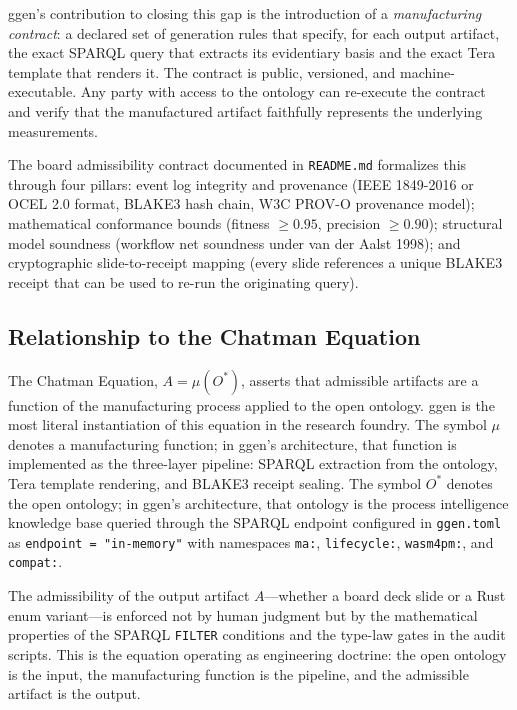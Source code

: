 ggen's contribution to closing this gap is the introduction of a \emph{manufacturing contract}:
a declared set of generation rules that specify, for each output artifact, the exact SPARQL query
that extracts its evidentiary basis and the exact Tera template that renders it. The contract is
public, versioned, and machine-executable. Any party with access to the ontology can re-execute
the contract and verify that the manufactured artifact faithfully represents the underlying
measurements.

The board admissibility contract documented in \texttt{README.md} formalizes this through four
pillars: event log integrity and provenance (IEEE 1849-2016 or OCEL 2.0 format, BLAKE3 hash
chain, W3C PROV-O provenance model); mathematical conformance bounds (fitness $\geq 0.95$,
precision $\geq 0.90$); structural model soundness (workflow net soundness under van der Aalst
1998); and cryptographic slide-to-receipt mapping (every slide references a unique BLAKE3 receipt
that can be used to re-run the originating query).

\subsection{Relationship to the Chatman Equation}
\label{sec:ggen-lineage-chatman-equation}

The Chatman Equation, $A = \mu(O^*)$, asserts that admissible artifacts are a function of the
manufacturing process applied to the open ontology. ggen is the most literal instantiation of
this equation in the research foundry. The symbol $\mu$ denotes a manufacturing function; in
ggen's architecture, that function is implemented as the three-layer pipeline: SPARQL extraction
from the ontology, Tera template rendering, and BLAKE3 receipt sealing. The symbol $O^*$ denotes
the open ontology; in ggen's architecture, that ontology is the process intelligence knowledge
base queried through the SPARQL endpoint configured in \texttt{ggen.toml} as
\texttt{endpoint = "in-memory"} with namespaces \texttt{ma:}, \texttt{lifecycle:},
\texttt{wasm4pm:}, and \texttt{compat:}.

The admissibility of the output artifact $A$---whether a board deck slide or a Rust enum
variant---is enforced not by human judgment but by the mathematical properties of the SPARQL
\texttt{FILTER} conditions and the type-law gates in the audit scripts. This is the equation
operating as engineering doctrine: the open ontology is the input, the manufacturing function is
the pipeline, and the admissible artifact is the output.

